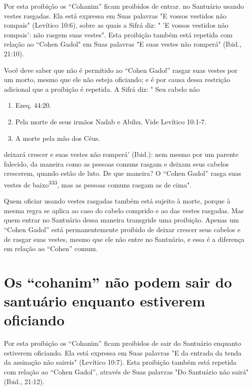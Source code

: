 Por esta proibição os ``Cohanim'' ficam proibidos de entrar. no San­tuário
usando vestes rasgadas. Ela está expressa em Suas palavras "E vossos
ves­tidos não rompais" (Levítico 10:6), sobre as quais a Sifrá diz: " 'E
vossos vesti­dos não rompais': não rasgem suas vestes". Esta proibição
também está repeti­da com relação ao ``Cohen Gadol" em Suas palavras "E
suas vestes não rompe­rá" (Ibid., 21:10).

Você deve saber que não é permitido ao ``Cohen Gadol'' rasgar suas vestes
por um morto, mesmo que ele não esteja oficiando; e é por causa dessa
restrição adicional que a proibição é repetida. A Sifrá diz: " Seu
cabelo não


\begin{enumerate}
\def\labelenumi{\arabic{enumi}.}
\setcounter{enumi}{329}
\item
 
 Ezeq. 44:20.
 
\item
 
 Pela morte de seus irmãos Nadab e Abihu. Vide Levítico 10:1-7.
 
\item
 
 A morte pela mão dos Céus.
 
\end{enumerate}



deixará crescer e suas vestes não romperá' (Ibid.): nem mesmo por um
parente falecido, da maneira como as pessoas comuns rasgam e deixam seus
cabelos crescerem, quando estão de luto. De que maneira? O ``Cohen Gadol''
rasga suas vestes de baixo\textsuperscript{333}, mas as pessoas comuns
rasgam as de cima".

Quem oficiar usando vestes rasgadas também está sujeito à morte, porque
à mesma regra se aplica ao caso do cabelo comprido e ao das vestes
rasgadas. Mas quem entrar no Santuário dessa maneira transgride uma
proibi­ção. Apenas um ``Cohen Gadol'' está permanentemente proibido de
deixar cres­cer seus cabelos e de rasgar suas vestes, mesmo que ele não
entre no Santuário, e essa é a diferença em relação ao ``Cohen'' comum.

\section{Os ``cohanim'' não podem sair do santuário enquanto estiverem oficiando}

Por esta proibição os ``Cohanim'' ficam proibidos de sair do Santuá­rio
enquanto estiverem oficiando. Ela está expressa em Suas palavras "E da
en­trada da tenda da assinação não saireis" (Levítico 10:7). Esta
proibição também está repetida com relação ao ``Cohen Gadol'', através de
Suas palavras "Do San­tuário não sairá" (Ibid., 21:12).

